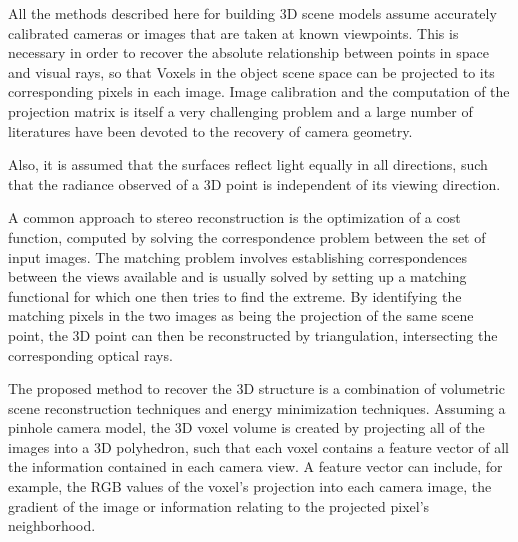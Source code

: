 All the methods described here for building 3D scene models assume accurately calibrated cameras or images that are taken at known viewpoints. This is necessary in order to recover the absolute relationship between points in space and visual rays, so that Voxels in the object scene space can be projected to its corresponding pixels in each image. Image calibration and the computation of the projection matrix is itself a very challenging problem and a large number of literatures have been devoted to the recovery of camera geometry.

Also, it is assumed that the surfaces reflect light equally in all directions, such that the radiance observed of a 3D point is independent of its viewing direction.

A common approach to stereo reconstruction is the optimization of a cost function, computed by solving the correspondence problem between the set of input images. The matching problem involves establishing correspondences between the views available and is usually solved by setting up a matching functional for which one then tries to find the extreme.  By identifying the matching pixels in the two images as being the projection of the same scene point, the 3D point can then be reconstructed by triangulation, intersecting the corresponding optical rays.

The proposed method to recover the 3D structure is a combination of volumetric scene reconstruction techniques and energy minimization techniques. Assuming a pinhole camera model, the 3D voxel volume is created by projecting all of the images into a 3D polyhedron, such that each voxel contains a feature vector of all the information contained in each camera view. A feature vector can include, for example, the RGB values of the voxel's projection into each camera image, the gradient of the image or information relating to the projected pixel's neighborhood. 

